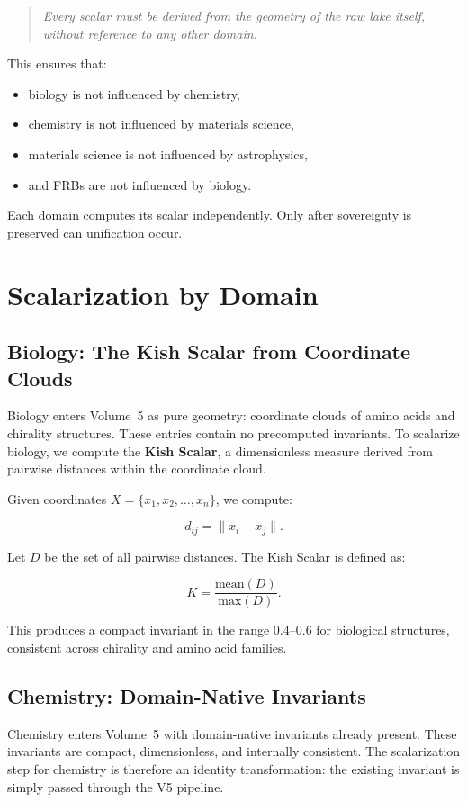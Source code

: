 \documentclass[11pt, letterpaper, openany]{book}
\begin{document}
\begin{quote}
\textit{Every scalar must be derived from the geometry of the raw lake itself, without reference to any other domain.}
\end{quote}

This ensures that:

\begin{itemize}
    \item biology is not influenced by chemistry,
    \item chemistry is not influenced by materials science,
    \item materials science is not influenced by astrophysics,
    \item and FRBs are not influenced by biology.
\end{itemize}

Each domain computes its scalar independently.  
Only after sovereignty is preserved can unification occur.

\section*{Scalarization by Domain}

\subsection*{Biology: The Kish Scalar from Coordinate Clouds}
Biology enters Volume~5 as pure geometry: coordinate clouds of amino acids and chirality structures.
These entries contain no precomputed invariants. To scalarize biology, we compute the \textbf{Kish
Scalar}, a dimensionless measure derived from pairwise distances within the coordinate cloud.

Given coordinates $X = \{x_1, x_2, \dots, x_n\}$, we compute:



\[
d_{ij} = \| x_i - x_j \|.
\]



Let $D$ be the set of all pairwise distances. The Kish Scalar is defined as:



\[
K = \frac{\mathrm{mean}(D)}{\mathrm{max}(D)}.
\]



This produces a compact invariant in the range $0.4$–$0.6$ for biological structures, consistent across
chirality and amino acid families.

\subsection*{Chemistry: Domain-Native Invariants}
Chemistry enters Volume~5 with domain-native invariants already present. These invariants are
compact, dimensionless, and internally consistent. The scalarization step for chemistry is therefore
an identity transformation: the existing invariant is simply passed through the V5 pipeline.
\end{document}

